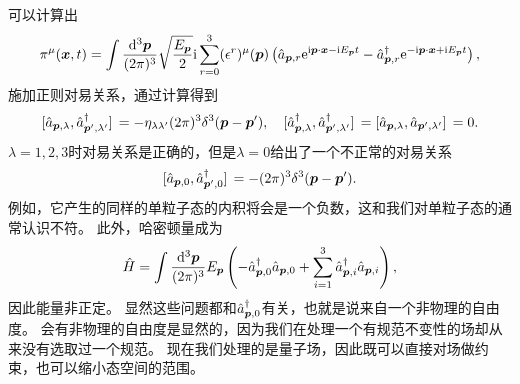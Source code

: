\documentclass[hyperref, UTF8, a4paper]{ctexart}
\newcommand*{\ii}{\mathrm{i}}
\newcommand*{\ee}{\mathrm{e}}
\begin{document}
可以计算出
\begin{equation}
    \pi^\mu (\vb*{x}, t) = \int \frac{\dd[3]{\vb*{p}}}{(2\pi)^3} \sqrt{\frac{E_{\vb*{p}}}{2}} \ii \sum_{r=0}^3 (\epsilon^r)^\mu (\vb*{p}) \left( \hat{a}_{\vb*{p}, r} \ee^{\ii \vb*{p} \cdot \vb*{x} - \ii E_{\vb*{p}} t} - \hat{a}_{\vb*{p}, r}^\dagger \ee^{ - \ii \vb*{p} \cdot \vb*{x} + \ii E_{\vb*{p}} t} \right),
\end{equation}
施加正则对易关系，通过计算得到
\begin{equation}
    \comm*{\hat{a}_{\vb*{p}, \lambda}}{\hat{a}^\dagger_{\vb*{p}', \lambda'}} = - \eta_{\lambda \lambda'} (2\pi)^3 \delta^3(\vb*{p} - \vb*{p}'), \quad \comm*{\hat{a}^\dagger_{\vb*{p}, \lambda}}{\hat{a}^\dagger_{\vb*{p}', \lambda'}} = \comm*{\hat{a}_{\vb*{p}, \lambda}}{\hat{a}_{\vb*{p}', \lambda'}} = 0.
\end{equation}
$\lambda=1, 2, 3$时对易关系是正确的，但是$\lambda=0$给出了一个不正常的对易关系
\[
    \comm*{\hat{a}_{\vb*{p}, 0}}{\hat{a}^\dagger_{\vb*{p}', 0}} = - (2\pi)^3 \delta^3 (\vb*{p} - \vb*{p}').
\]
例如，它产生的同样的单粒子态的内积将会是一个负数，这和我们对单粒子态的通常认识不符。
此外，哈密顿量成为
\begin{equation}
    \hat{H} = \int \frac{\dd[3]{\vb*{p}}}{(2\pi)^3} E_{\vb*{p}} \left( - \hat{a}_{\vb*{p},0}^\dagger \hat{a}_{\vb*{p}, 0} + \sum_{i=1}^3 \hat{a}_{\vb*{p},i}^\dagger \hat{a}_{\vb*{p}, i} \right),
\end{equation}
因此能量非正定。
显然这些问题都和$\hat{a}^\dagger_{\vb*{p},0}$有关，也就是说来自一个非物理的自由度。
会有非物理的自由度是显然的，因为我们在处理一个有规范不变性的场却从来没有选取过一个规范。
现在我们处理的是量子场，因此既可以直接对场做约束，也可以缩小态空间的范围。
\end{document}

